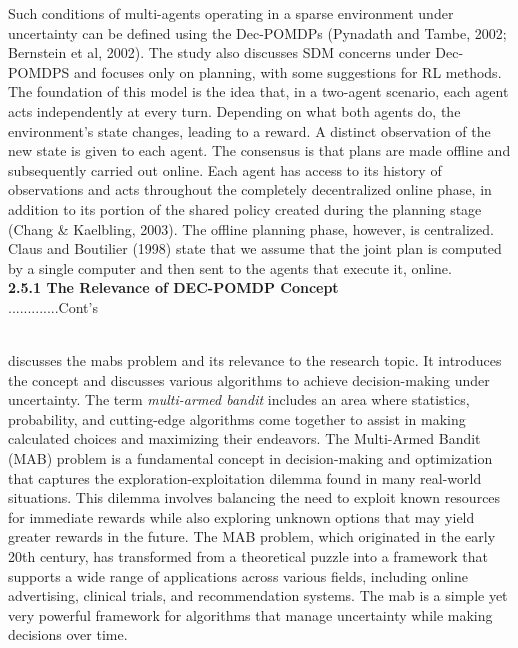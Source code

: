 \documentclass[a4paper,11pt,onecolumn]{article}
\begin{document}
Such conditions of multi-agents operating in a sparse environment under uncertainty can be defined using the Dec-POMDPs (Pynadath and Tambe, 2002; Bernstein et al, 2002). The study also discusses SDM concerns under Dec-POMDPS and focuses only on planning, with some suggestions for RL methods. The foundation of this model is the idea that, in a two-agent scenario, each agent acts independently at every turn. Depending on what both agents do, the environment's state changes, leading to a reward. A distinct observation of the new state is given to each agent. The consensus is that plans are made offline and subsequently carried out online. Each agent has access to its history of observations and acts throughout the completely decentralized online phase, in addition to its portion of the shared policy created during the planning stage (Chang & Kaelbling, 2003).  The offline planning phase, however, is centralized. Claus and Boutilier (1998) state that we assume that the joint plan is computed by a single computer and then sent to the agents that execute it, online. \newline \\

\textbf{2.5.1 The Relevance of DEC-POMDP Concept}\\

.............Cont's



 






 
 




 


\newline\\

\Cite{slivkins:2024} discusses the \glspl{mab}  problem and its relevance to the research topic. It introduces the concept and discusses various algorithms to achieve decision-making under uncertainty. The term \emph{multi-armed bandit} includes an area where statistics, probability, and cutting-edge algorithms come together to assist in making calculated choices and maximizing their endeavors.
The Multi-Armed Bandit (MAB) problem is a fundamental concept in decision-making and optimization that captures the exploration-exploitation dilemma found in many real-world situations. This dilemma involves balancing the need to exploit known resources for immediate rewards while also exploring unknown options that may yield greater rewards in the future. The MAB problem, which originated in the early 20th century, has transformed from a theoretical puzzle into a framework that supports a wide range of applications across various fields, including online advertising, clinical trials, and recommendation systems. 
The \gls{mab} is a simple yet very powerful framework for algorithms that manage uncertainty while making decisions over time. 
\end{document}
